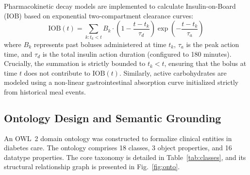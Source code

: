 \documentclass[10pt,a4paper]{article}
\begin{document}
Pharmacokinetic decay models are implemented to calculate Insulin-on-Board (IOB) based on exponential two-compartment clearance curves:
\begin{equation}
\mathrm{IOB}(t) = \sum_{k: t_k < t} B_k \cdot \left(1 - \frac{t - t_k}{\tau_d}\right) \exp\left(-\frac{t - t_k}{\tau_a}\right)
\end{equation}
where $B_k$ represents past boluses administered at time $t_k$, $\tau_a$ is the peak action time, and $\tau_d$ is the total insulin action duration (configured to 180 minutes). Crucially, the summation is strictly bounded to $t_k < t$, ensuring that the bolus at time $t$ does not contribute to $\mathrm{IOB}(t)$. Similarly, active carbohydrates are modeled using a non-linear gastrointestinal absorption curve initialized strictly from historical meal events.

\subsection{Ontology Design and Semantic Grounding}
An OWL~2 domain ontology was constructed to formalize clinical entities in diabetes care. The ontology comprises 18 classes, 3 object properties, and 16 datatype properties. The core taxonomy is detailed in Table~\ref{tab:classes}, and its structural relationship graph is presented in Fig.~\ref{fig:onto}.
\end{document}
